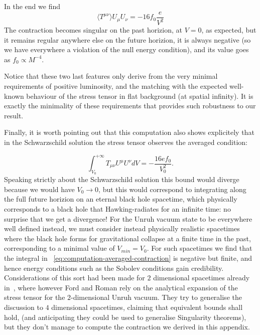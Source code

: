 In the end we find
\begin{equation}
    \label{eq:contraction-stress-tensor}
    \langle T^{\mu\nu}\rangle U_{\mu}U_{\nu} =  -16f_0\frac{e}{V^2}
\end{equation}
The contraction becomes singular on the past horizion, at \(V = 0\), as expected, but it remains regular anywhere else on the future horizion, it is always negative (so we have everywhere a violation of the null energy condition), and its value goes as \(f_0 \propto M^{-4}\). 

Notice that these two last features only derive from the very minimal requirements of positive luminosity, and the matching with the expected well-known behaviour of the stress tensor in flat background (at spatial infinity). It is exactly the minimality of these requirements that provides such robustness to our result.

Finally, it is worth pointing out that this computation also shows explicitely that in the Schwarzschild solution the stress tensor observes the averaged condition:

\begin{equation}
    \label{eq:computation-averaged-contraction}
    \int_{V_0}^{+\infty} T_{\mu\nu}U^{\mu}U^{\nu} dV = - \frac{16ef_0}{V_0^2}.
\end{equation}
Speaking strictly about the Schwarzschild solution this bound would diverge because we would have \(V_0\rightarrow 0\), but this would correspond to integrating along the full future horizion on an eternal black hole spacetime, which physically corresponds to a black hole that Hawking-radiates for an infinite time: no surprise that we get a divergence!
For the Unruh vacuum state to be everywhere well defined instead, we must consider instead physically realistic spacetimes where the black hole forms for gravitational collapse at a finite time in the past, corresponding to a minimal value of \(V_{min} = V_0\). For such spacetimes we find that the integral in ~\eqref{eq:computation-averaged-contraction} is negative but finite, and hence energy conditions such as the Sobolev conditions gain credibility.
Considerations of this sort had been made for \(2\) dimensional spacetimes already in~\cite[]{ford1996averaged}, where however Ford and Roman rely on the analytical expansion of the stress tensor for the \(2\)-dimensional Unruh vacuum. They try to generalise the discussion to \(4\) dimensional spacetimes, claiming that equivalent bounds shall hold, (and anticipating they could be used to generalise Singularity theorems), but they don't manage to compute the contraction we derived in this appendix.


